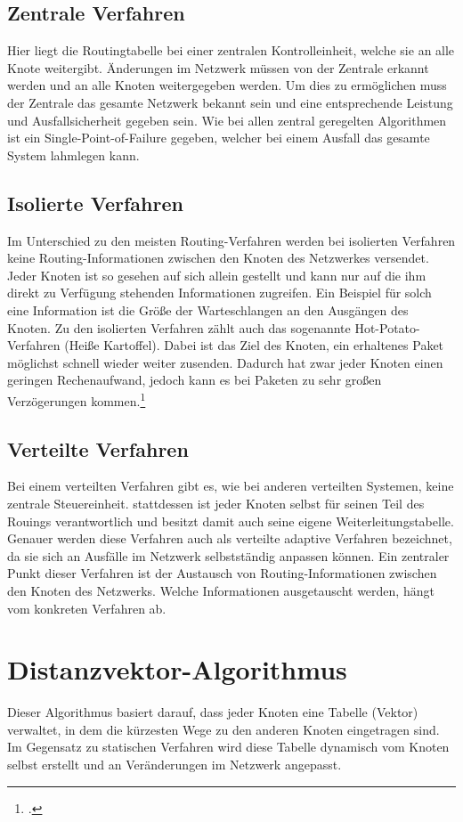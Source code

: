 \subsection{Zentrale Verfahren}
Hier liegt die Routingtabelle bei einer zentralen Kontrolleinheit, welche sie an alle Knote weitergibt. Änderungen im Netzwerk müssen von der Zentrale erkannt werden und an alle Knoten weitergegeben werden. Um dies zu ermöglichen muss der Zentrale das gesamte Netzwerk bekannt sein und eine entsprechende Leistung und Ausfallsicherheit gegeben sein. Wie bei allen zentral geregelten Algorithmen ist ein Single-Point-of-Failure gegeben, welcher bei einem Ausfall das gesamte System lahmlegen kann.

\subsection{Isolierte Verfahren}
Im Unterschied zu den meisten Routing-Verfahren werden bei isolierten Verfahren keine Routing-Informationen zwischen den Knoten des Netzwerkes versendet. Jeder Knoten ist so gesehen auf sich allein gestellt und kann nur auf die ihm direkt zu Verfügung stehenden Informationen zugreifen. Ein Beispiel für solch eine Information ist die Größe der Warteschlangen an den Ausgängen des Knoten. Zu den isolierten Verfahren zählt auch das sogenannte Hot-Potato-Verfahren (Heiße Kartoffel). Dabei ist das Ziel des Knoten, ein erhaltenes Paket möglichst schnell wieder weiter zusenden. Dadurch hat zwar jeder Knoten einen geringen Rechenaufwand, jedoch kann es bei Paketen zu sehr großen Verzögerungen kommen.\footcite{routing-wiki}

\subsection{Verteilte Verfahren}
Bei einem verteilten Verfahren gibt es, wie bei anderen verteilten Systemen, keine zentrale Steuereinheit. stattdessen ist jeder Knoten selbst für seinen Teil des Rouings verantwortlich und besitzt damit auch seine eigene Weiterleitungstabelle. Genauer werden diese Verfahren auch als verteilte adaptive Verfahren bezeichnet, da sie sich an Ausfälle im Netzwerk selbstständig anpassen können. Ein zentraler Punkt dieser Verfahren ist der Austausch von Routing-Informationen zwischen den Knoten des Netzwerks. Welche Informationen ausgetauscht werden, hängt vom konkreten Verfahren ab.

\section{Distanzvektor-Algorithmus}
Dieser Algorithmus basiert darauf, dass jeder Knoten eine Tabelle (Vektor) verwaltet, in dem die kürzesten Wege zu den anderen Knoten eingetragen sind. Im Gegensatz zu statischen Verfahren wird diese Tabelle dynamisch vom Knoten selbst erstellt und an Veränderungen im Netzwerk angepasst.

